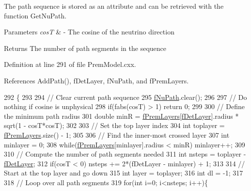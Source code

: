 The path sequence is stored as an attribute and can be retrieved with the function Get\+Nu\+Path.


\begin{DoxyParams}{Parameters}
{\em cosT} & -\/ The cosine of the neutrino direction \\
\hline
\end{DoxyParams}
\begin{DoxyReturn}{Returns}
The number of path segments in the sequence 
\end{DoxyReturn}


Definition at line 291 of file Prem\+Model.\+cxx.



References Add\+Path(), f\+Det\+Layer, f\+Nu\+Path, and f\+Prem\+Layers.


\begin{DoxyCode}
292 \{
293 
294   \textcolor{comment}{// Clear current path sequence}
295   \hyperlink{classOscProb_1_1PremModel_aaf3c77e35798d664853157013c90ad2b}{fNuPath}.clear();
296   
297   \textcolor{comment}{// Do nothing if cosine is unphysical}
298   \textcolor{keywordflow}{if}(fabs(cosT) > 1) \textcolor{keywordflow}{return} 0;
299 
300   \textcolor{comment}{// Define the minimum path radius}
301   \textcolor{keywordtype}{double} minR = \hyperlink{classOscProb_1_1PremModel_a19a9a3b23ec154ad7a29f92b74aa5bc6}{fPremLayers}[\hyperlink{classOscProb_1_1PremModel_a4fb68506493666349f418b893a996185}{fDetLayer}].radius * sqrt(1 - cosT*cosT);
302 
303   \textcolor{comment}{// Set the top layer index}
304   \textcolor{keywordtype}{int} toplayer = \hyperlink{classOscProb_1_1PremModel_a19a9a3b23ec154ad7a29f92b74aa5bc6}{fPremLayers}.size() - 1;
305   
306   \textcolor{comment}{// Find the inner-most crossed layer}
307   \textcolor{keywordtype}{int} minlayer = 0;
308   \textcolor{keywordflow}{while}(\hyperlink{classOscProb_1_1PremModel_a19a9a3b23ec154ad7a29f92b74aa5bc6}{fPremLayers}[minlayer].radius < minR) minlayer++; 
309 
310   \textcolor{comment}{// Compute the number of path segments needed}
311   \textcolor{keywordtype}{int} nsteps = toplayer - \hyperlink{classOscProb_1_1PremModel_a4fb68506493666349f418b893a996185}{fDetLayer};
312   \textcolor{keywordflow}{if}(cosT < 0) nsteps += 2*(fDetLayer - minlayer) + 1;
313 
314   \textcolor{comment}{// Start at the top layer and go down}
315   \textcolor{keywordtype}{int} layer = toplayer;
316   \textcolor{keywordtype}{int} dl = -1;
317   
318   \textcolor{comment}{// Loop over all path segments}
319   \textcolor{keywordflow}{for}(\textcolor{keywordtype}{int} i=0; i<nsteps; i++)\{

\end{DoxyCode}
